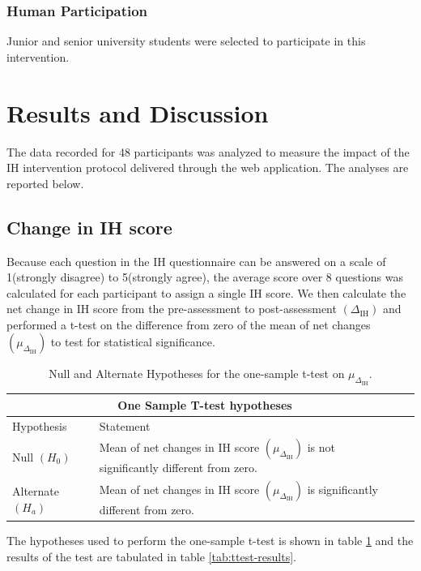 \documentclass{scrartcl}
\begin{document}
\subsubsection{Human Participation}
\label{section:human-participation}
Junior and senior university students were selected to participate in this intervention.
\section{Results and Discussion}

The data recorded for 48 participants was analyzed to measure the impact of the IH intervention protocol delivered through the web application. The analyses are reported below.

\subsection{Change in IH score}
Because each question in the IH questionnaire can be answered on a scale of 1(strongly disagree) to 5(strongly agree), the average score over 8 questions was calculated for each participant to assign a single IH score. We then calculate the net change in IH score from the pre-assessment to post-assessment $(\Delta_\text{IH})$ and performed a t-test on the difference from zero of the mean of net changes $(\mu_{\Delta_\text{IH}})$ to test for statistical significance.

\begin{table}[ht]
    \centering
    \begin{tabular}{llr}
\hline
\multicolumn{2}{c}{\textbf{One Sample T-test hypotheses}} \\
\hline
Hypothesis    & Statement \\
\hline
Null $(H_0)$  & Mean of net changes in IH score $(\mu_{\Delta_\text{IH}})$ is not significantly different from zero.\\
Alternate $(H_a)$ & Mean of net changes in IH score $(\mu_{\Delta_\text{IH}})$ is significantly different from zero. \\
\hline
\end{tabular}
    \caption{Null and Alternate Hypotheses for the one-sample t-test on $\mu_{\Delta_\text{IH}}$.}
    \label{tab:hypotheses}
\end{table}

The hypotheses used to perform the one-sample t-test is shown in table \ref{tab:hypotheses} and the results of the test are tabulated in table \ref{tab:ttest-results}.
\end{document}
